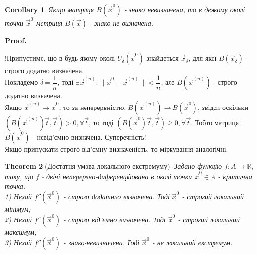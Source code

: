\documentclass[a4paper, 10pt]{article}
\makeatletter
\def\qed{$\blacksquare$}
\theoremstyle{theoremdd}
\newtheorem{theorem}{Theorem}[subsection]
\theoremstyle{theoremdd}
\theoremstyle{theoremdd}
\theoremstyle{theoremdd}
\theoremstyle{theoremdd}
\theoremstyle{theoremdd}
\theoremstyle{theoremdd}
\theoremstyle{theoremdd}
\theoremstyle{theoremdd}
\newtheorem{corollary}[theorem]{Corollary}
\renewenvironment{proof}[1][Proof.\\]{\par
\pushQED{\hfill \qed}%
\normalfont \topsep6\p@\@plus6\p@\relax
\trivlist
\item\relax
{\bfseries
#1\@addpunct{.}}\hspace\labelsep\ignorespaces
}{%
\popQED\endtrivlist\@endpefalse
}
\newcommand\Norm[1]{\|#1\|}
\makeatother
\begin{document}
\begin{corollary}
Якщо матриця $B(\vec{x}^0)$ - знако невизначена, то в деякому околі точки $\vec{x}^0$ матриця $B(\vec{x})$ - знако не визначена.
\end{corollary}

\begin{proof}
!Припустимо, що в будь-якому околі $U_\delta (\vec{x}^0)$ знайдеться $\vec{x}_\delta$, для якої $B(\vec{x}_\delta)$ - строго додатно визначена.\\
Покладемо $\delta = \dfrac{1}{n}$, тоді $\exists \vec{x}^{(n)}: \Norm{\vec{x}^0 - \vec{x}^{(n)}} < \dfrac{1}{n}$, але $B(\vec{x}^{(n)})$ - строго додатно визначена.\\
Якщо $\vec{x}^{(n)} \to \vec{x}^{0}$, то за неперервністю, $B(\vec{x}^{(n)}) \to B(\vec{x}^0)$, звідси оскільки $(B(\vec{x}^{(n)}) \vec{t}, \vec{t}) > 0, \forall \vec{t}$, то тоді $(B(\vec{x}^{0}) \vec{t}, \vec{t}) \geq 0, \forall \vec{t}$. Тобто матриця $\vec{B}(\vec{x}^0)$ - невід'ємно визначена. Суперечність!\\
Якщо припускати строго від'ємну визначеність, то міркування аналогічні.
\end{proof}


\begin{theorem}[Достатня умова локального екстремуму]
Задано функцію $f\colon A \to \mathbb{R}$, таку, що $f$ - двічі неперервно-диференційована в околі точки $\vec{x}^0 \in A$ - критична точка.\\
1) Нехай $f''(\vec{x}^0)$ - строго додатньо визначена. Тоді $\vec{x}^0$ - строгий локальний мінімум;\\
2) Нехай $f''(\vec{x}^0)$ - строго від'ємно визначена. Тоді $\vec{x}^0$ - строгий локальний максимум;\\
3) Нехай $f''(\vec{x}^0)$ - знако-невизначена. Тоді $\vec{x}^0$ - не локальний екстремум.
\end{theorem}
\end{document}
